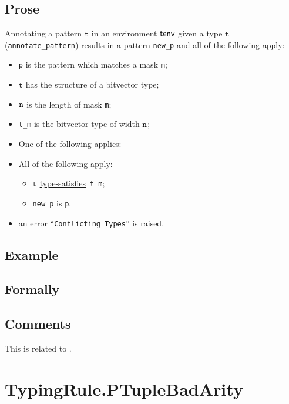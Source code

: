 \documentclass{book}
\newcommand\typesatisfies[0]{\hyperlink{def-typesatisfies}{type-satisfies}}
\newcommand\vt[0]{\texttt{t}}
\begin{document}
  \subsection{Prose}
   Annotating a pattern $\vt$ in an environment $\textsf{tenv}$ given a type $\vt$ (\texttt{annotate\_pattern}) results in a pattern \texttt{new\_p} and all of the following apply:
   \begin{itemize}
   \item \texttt{p} is the pattern which matches a mask \texttt{m};
   \item $\vt$ has the structure of a bitvector type;
   \item $\texttt{n}$ is the length of mask \texttt{m};
   \item \texttt{t\_m} is the bitvector type of width $\texttt{n}$;
   \item One of the following applies:
     \item All of the following apply:
       \begin{itemize}
       \item $\vt$ \typesatisfies\  \texttt{t\_m};
       \item \texttt{new\_p} is \texttt{p}.
       \end{itemize}
     \item an error ``\texttt{Conflicting Types}'' is raised.
   \end{itemize}

  \subsection{Example}



\begin{emptyformal}
    \subsection{Formally}
\end{emptyformal}

\subsection{Comments}
  This is related to .

\section{TypingRule.PTupleBadArity \label{sec:TypingRule.PTupleBadArity}}
\end{document}
